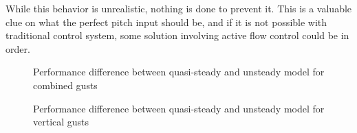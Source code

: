 \par While this behavior is unrealistic, nothing is done to prevent it.
This is a valuable clue on what the perfect pitch input should be, and if it is not possible with traditional control system, some solution involving active flow control could be in order.


\begin{figure}[h]
  \begin{center}
  \end{center}
  \caption{Performance difference between quasi-steady and unsteady model for combined gusts}
  \label{fig:WG_vs_TG_wt=3}
\end{figure}


\begin{figure}[h]
  \centering
  \caption{Performance difference between quasi-steady and unsteady model for vertical gusts}
  \label{fig:WG_vs_TG_wt=1}
\end{figure}

